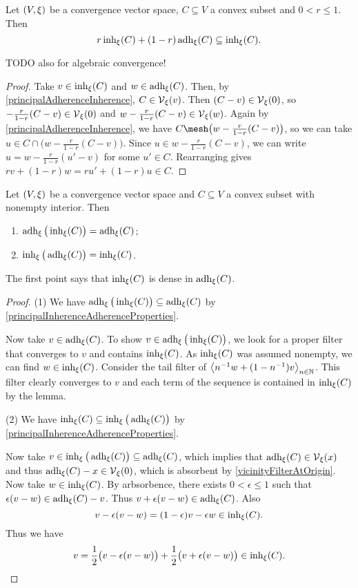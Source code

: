 \begin{lemma}
Let $\sSet{V,\xi}$ be a convergence vector space, $C\subseteq V$ a convex subset and $0<r\leq 1$. Then
\[ r\operatorname{inh}_\xi(C) + (1-r)\operatorname{adh}_\xi(C) \subseteq \operatorname{inh}_\xi(C). \]
\end{lemma}
TODO also for algebraic convergence!
\begin{proof}
Take $v\in \operatorname{inh}_\xi(C)$ and $w\in \operatorname{adh}_\xi(C)$. Then, by \ref{principalAdherenceInherence}, $C\in \operatorname{\mathcal{V}}_\xi(v)$. Then $(C- v)\in \operatorname{\mathcal{V}}_\xi(0)$, so $-\frac{r}{1-r}(C-v)\in \operatorname{\mathcal{V}}_\xi(0)$ and $w - \frac{r}{1-r}(C-v) \in \operatorname{\mathcal{V}}_\xi(w)$. Again by \ref{principalAdherenceInherence}, we have $C \mesh \big(w - \frac{r}{1-r}(C-v)\big)$, so we can take $u \in C \cap \big(w - \frac{r}{1-r}(C-v)\big)$. Since $u\in w - \frac{r}{1-r}(C-v)$, we can write $u = w - \frac{r}{1-r}(u'-v)$ for some $u'\in C$. Rearranging gives $rv + (1-r)w = ru'+ (1-r)u \in C$.
\end{proof}
\begin{corollary} \label{adherenceInherenceClosureConvexSets}
Let $\sSet{V,\xi}$ be a convergence vector space and $C\subseteq V$ a convex subset with nonempty interior. Then
\begin{enumerate}
\item $\operatorname{adh}_\xi\big(\operatorname{inh}_\xi(C)\big) = \operatorname{adh}_\xi(C)$;
\item $\operatorname{inh}_\xi\big(\operatorname{adh}_\xi(C)\big) = \operatorname{inh}_\xi(C)$.
\end{enumerate}
\end{corollary}
The first point says that $\operatorname{inh}_\xi(C)$ is dense in $\operatorname{adh}_\xi(C)$.
\begin{proof}
(1) We have $\operatorname{adh}_\xi\big(\operatorname{inh}_\xi(C)\big) \subseteq \operatorname{adh}_\xi(C)$ by \ref{principalInherenceAdherenceProperties}.

Now take $v\in \operatorname{adh}_\xi(C)$. To show $v\in \operatorname{adh}_\xi\big(\operatorname{inh}_\xi(C)\big)$, we look for a proper filter that converges to $v$ and contains $\operatorname{inh}_\xi(C)$. As $\operatorname{inh}_\xi(C)$ was assumed nonempty, we can find $w\in \operatorname{inh}_\xi(C)$. Consider the tail filter of $\left\langle n^{-1}w + (1-n^{-1})v \right\rangle_{n\in \mathbb{N}}$. This filter clearly converges to $v$ and each term of the sequence is contained in $\operatorname{inh}_\xi(C)$ by the lemma.

(2) We have $\operatorname{inh}_\xi(C) \subseteq \operatorname{inh}_\xi\big(\operatorname{adh}_\xi(C)\big)$ by \ref{principalInherenceAdherenceProperties}.

Now take $v\in \operatorname{inh}_\xi\big(\operatorname{adh}_\xi(C)\big)\subseteq \operatorname{adh}_\xi(C)$, which implies that $\operatorname{adh}_\xi(C)\in \operatorname{\mathcal{V}}_\xi(x)$ and thus $\operatorname{adh}_\xi(C)-x\in \operatorname{\mathcal{V}}_\xi(0)$, which is absorbent by \ref{vicinityFilterAtOrigin}. Now take $w\in \operatorname{inh}_\xi(C)$. By arbsorbence, there exists $0<\epsilon \leq 1$ such that $\epsilon(v-w)\in \operatorname{adh}_\xi(C)-v$. Thus $v+ \epsilon(v-w)\in \operatorname{adh}_\xi(C)$. Also
\[ v - \epsilon(v-w) = (1-\epsilon)v - \epsilon w \in \operatorname{inh}_\xi(C). \]
Thus we have
\[ v = \frac{1}{2}\big(v - \epsilon(v-w)\big) + \frac{1}{2}\big(v + \epsilon(v-w)\big)\in \operatorname{inh}_\xi(C). \]
\end{proof}

